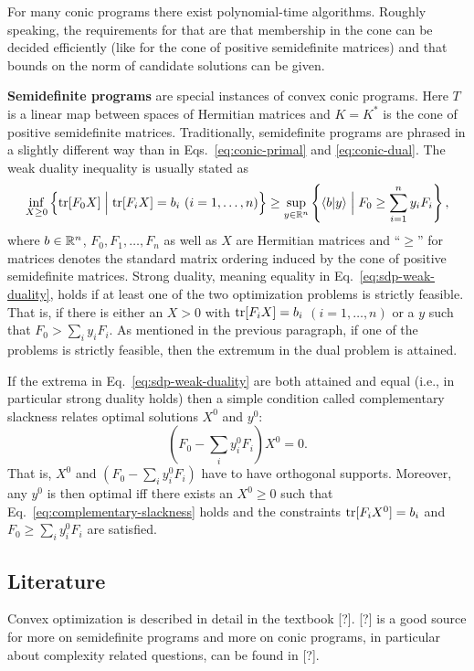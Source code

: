 \documentclass[11pt,a4paper]{article}
\numberwithin{equation}{section}
\begin{document}
For many conic programs there exist polynomial-time algorithms. Roughly
speaking, the requirements for that are that membership in the cone can be
decided efficiently (like for the cone of positive semidefinite matrices) and
that bounds on the norm of candidate solutions can be given.

\noindent\textbf{Semidefinite programs}
are special instances of convex conic programs. Here $T$ is a linear map
between spaces of Hermitian matrices and $K=K^{*}$ is the cone of positive
semidefinite matrices. Traditionally, semidefinite programs are phrased in a
slightly different way than in Eqs.~\eqref{eq:conic-primal} and
\eqref{eq:conic-dual}. The weak duality inequality is usually stated as
\begin{equation}\label{eq:sdp-weak-duality}
    \begin{aligned}
        \inf_{X\ge 0}\left\{\tr[F_0X] \Bigm| \tr[F_iX]=b_i \ (i=1,\dots,n)\right\}
        \ge
        \sup_{y\in \RR^{n}}\left\{\langle b|y\rangle \Bigm| F_0 \ge \sum_{i=1}^{n} y_i F_i\right\},
    \end{aligned}
\end{equation}
where $b\in \mathbb{R}^{n}$, $F_0,F_1,\ldots,F_n$ as well as $X$ are Hermitian matrices
and ``$\ge$'' for matrices denotes the standard matrix ordering induced by the
cone of positive semidefinite matrices. Strong duality, meaning equality in
Eq.~\eqref{eq:sdp-weak-duality}, holds if at least one of the two optimization
problems is strictly feasible. That is, if there is either an $X>0$ with
$\operatorname{tr}[F_iX]=b_i$ $(i=1,\dots,n)$ or a $y$ such that $F_0>\sum_i y_iF_i$. As
mentioned in the previous paragraph, if one of the problems is strictly
feasible, then the extremum in the dual problem is attained.

If the extrema in Eq.~\eqref{eq:sdp-weak-duality} are both attained and equal
(i.e., in particular strong duality holds) then a simple condition called
complementary slackness relates optimal solutions $X^0$ and $y^0$:
\begin{equation}\label{eq:complementary-slackness}
    \left(F_0 - \sum_i y_i^{0} F_i\right) X^{0} = 0.
\end{equation}
That is, $X^0$ and $(F_0-\sum_i y_i^{0}F_i)$ have to have orthogonal
supports. Moreover, any $y^0$ is then optimal iff there exists an $X^0\ge 0$
such that Eq.~\eqref{eq:complementary-slackness} holds and the constraints
$\operatorname{tr}[F_iX^0]=b_i$ and $F_0\ge \sum_i y_i^{0}F_i$ are satisfied.

\subsection{Literature}

Convex optimization is described in detail in the textbook [?]. [?] is a good
source for more on semidefinite programs and more on conic programs, in
particular about complexity related questions, can be found in [?].
\end{document}
